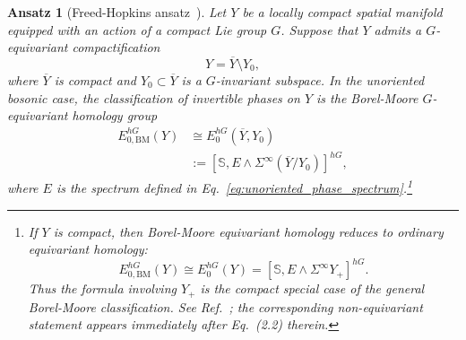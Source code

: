 \documentclass[aps,prx,reprint,superscriptaddress,twocolumn,amsmath,amssymb,amsfonts, nofootinbib]{revtex4-2}
\theoremstyle{apsstyle}
\newtheorem{ansatz}[theorem]{Ansatz}
\begin{document}
\bigskip

\begin{ansatz}[Freed-Hopkins ansatz~{\cite[Ansatz~3.3]{Freed2021}}]
\label{ansatz:equivariant_BM_classification}
Let $Y$ be a locally compact spatial manifold equipped with an action
of a compact Lie group $G$. Suppose that $Y$ admits a
$G$-equivariant compactification
\begin{equation*}
    Y=\overline Y\setminus Y_0,
\end{equation*}
where $\overline Y$ is compact and $Y_0\subset\overline Y$ is a
$G$-invariant subspace. In the unoriented bosonic case, the
classification of invertible phases on $Y$ is the Borel-Moore
$G$-equivariant homology group
\begin{equation}
\begin{aligned}
    E_{0,\mathrm{BM}}^{hG}(Y)
    &\cong
    E_0^{hG}(\overline Y,Y_0)\\
    &:=
    \left[
        \mathbb S,
        E\wedge
        \Sigma^\infty(\overline Y/Y_0)
    \right]^{hG},
\end{aligned}
\label{eq:equivariant_BM_classification}
\end{equation}
where $E$ is the spectrum defined in
Eq.~\eqref{eq:unoriented_phase_spectrum}.\footnote{If $Y$ is compact,
then Borel-Moore equivariant homology reduces to ordinary
equivariant homology:
\begin{equation*}
    E_{0,\mathrm{BM}}^{hG}(Y)
    \cong
    E_0^{hG}(Y)
    =
    \left[
        \mathbb S,
        E\wedge\Sigma^\infty Y_+
    \right]^{hG}.
\end{equation*}
Thus the formula involving $Y_+$ is the compact special case of the
general Borel-Moore classification. See
Ref.~\cite[Eq.~(3.2) and Ansatz~3.3]{Freed2021}; the corresponding
non-equivariant statement appears immediately after
Eq.~(2.2) therein.}
\end{ansatz}

\bigskip
\end{document}
